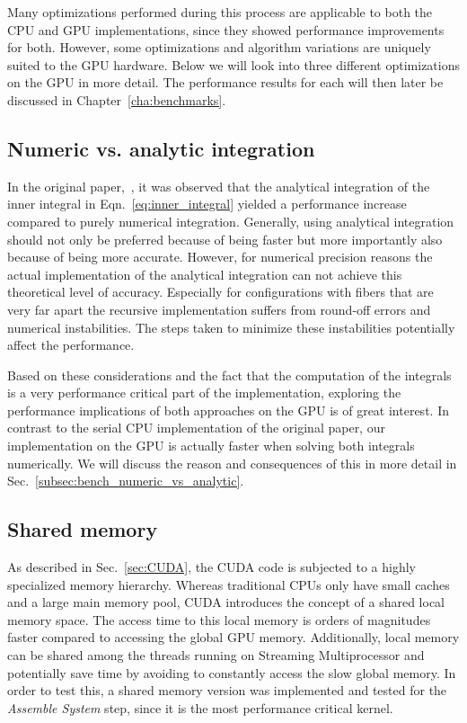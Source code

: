 Many optimizations performed during this process are applicable to both the CPU and GPU implementations, since they showed performance improvements for both. However, some optimizations and algorithm variations are uniquely suited to the GPU hardware. Below we will look into three different optimizations on the GPU in more detail. The performance results for each will then later be discussed in Chapter~\ref{cha:benchmarks}.

\subsection{Numeric vs. analytic integration}
\label{subsec:numeric_analytic}
In the original paper,~\cite{Tornberg2006}, it was observed that the analytical integration of the inner integral in Eqn.~\eqref{eq:inner_integral} yielded a performance increase compared to purely numerical integration. Generally, using analytical integration should not only be preferred because of being faster but more importantly also because of being more accurate. However, for numerical precision reasons the actual implementation of the analytical integration can not achieve this theoretical level of accuracy. Especially for configurations with fibers that are very far apart the recursive implementation suffers from round-off errors and numerical instabilities. The steps taken to minimize these instabilities potentially affect the performance.

Based on these considerations and the fact that the computation of the integrals is a very performance critical part of the implementation, exploring the performance implications of both approaches on the GPU is of great interest. In contrast to the serial CPU implementation of the original paper, our implementation on the GPU is actually faster when solving both integrals numerically. We will discuss the reason and consequences of this in more detail in Sec.~\ref{subsec:bench_numeric_vs_analytic}.

\subsection{Shared memory}
\label{subsec:shared_memory}

As described in Sec.~\ref{sec:CUDA}, the CUDA code is subjected to a highly specialized memory hierarchy. Whereas traditional CPUs only have small caches and a large main memory pool, CUDA introduces the concept of a shared local memory space. The access time to this local memory is orders of magnitudes faster compared to accessing the global GPU memory. Additionally, local memory can be shared among the threads running on Streaming Multiprocessor and potentially save time by avoiding to constantly access the slow global memory. In order to test this, a shared memory version was implemented and tested for the \emph{Assemble System} step, since it is the most performance critical kernel.

